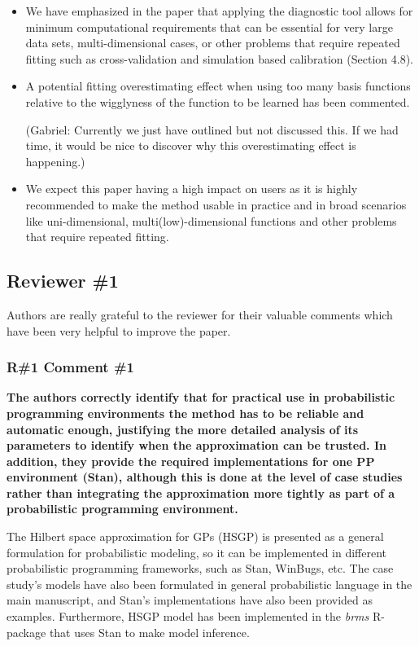 \documentclass[11pt]{report}
\begin{document}
\begin{itemize}
\item We have emphasized in the paper that applying the diagnostic tool allows for minimum computational requirements that can be essential for very large data sets, multi-dimensional cases, or other problems that require repeated fitting such as cross-validation and simulation based calibration (Section 4.8).

\item A potential fitting overestimating effect when using too many basis functions relative to the wigglyness of the function to be learned has been commented. 

{\color{blue} (Gabriel: Currently we just have outlined but not discussed this. If we had time, it would be nice to discover why this overestimating effect is happening.)}

\item We expect this paper having a high impact on users as it is highly recommended to make the method usable in practice and in broad scenarios like uni-dimensional, multi(low)-dimensional functions and other problems that require repeated fitting.

\end{itemize}

\noindent \hdashrule{12.5cm}{0.2pt}{2mm 1pt}

\subsection*{Reviewer \#1}

Authors are really grateful to the reviewer for their valuable comments which have been very helpful to improve the paper.

\subsubsection*{R\#1 Comment \#1}

\textbf{The authors correctly identify that for practical use in probabilistic programming environments the method has to be reliable and automatic enough, justifying the more detailed analysis of its parameters to identify when the approximation can be trusted. In addition, they provide the required implementations for one PP environment (Stan), although this is done at the level of case studies rather than integrating the approximation more tightly as part of a probabilistic programming environment.}

The Hilbert space approximation for GPs (HSGP) is presented as a general formulation for probabilistic modeling, so it can be implemented in different probabilistic programming frameworks, such as Stan, WinBugs, etc. The case study's models have also been formulated in general probabilistic language in the main manuscript, and Stan's implementations have also been provided as examples. Furthermore, HSGP model has been implemented in the \textit{brms} R-package that uses Stan to make model inference.
\end{document}
